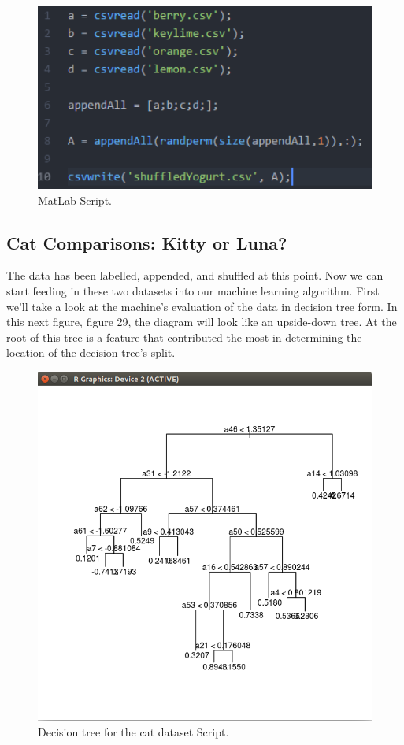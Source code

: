 \documentclass[12pt, letterpaper]{article}
\begin{document}
\begin{figure}[H]
\centering
\includegraphics[width=5.0in]{matlabfile}
\caption{MatLab Script.}
\label{fig:mls}
\end{figure}

\subsection{Cat Comparisons: Kitty or Luna?}
The data has been labelled, appended, and shuffled at this point. Now we can start feeding in these two datasets into our machine learning algorithm. First we'll take a look at the machine's evaluation of the data in decision tree form. In this next figure, figure 29, the diagram will look like an upside-down tree. At the root of this tree is a feature that contributed the most in determining the location of the decision tree's split.

\begin{figure}[H]
\centering
\includegraphics[width=5.0in]{catplot4}
\caption{Decision tree for the cat dataset Script.}
\label{fig:dtcd}
\end{figure}
\end{document}
